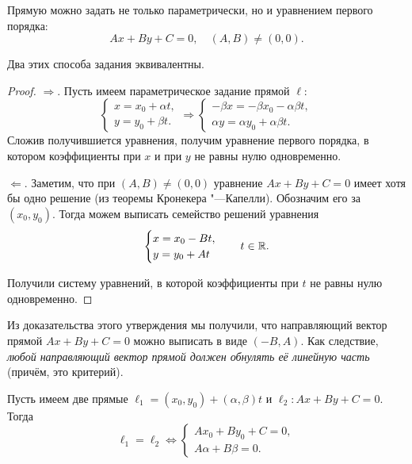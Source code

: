 Прямую можно задать не только параметрически, но и уравнением первого порядка:
$$
Ax + By + C = 0,\quad(A, B) \ne (0, 0).
$$

\begin{theorem}
    Два этих способа задания эквивалентны.
\end{theorem}

\begin{proof}
    $\Rightarrow$. Пусть имеем параметрическое задание прямой $\ell$:
    $$
    \begin{cases}
        x = x_0 + \alpha t,\\
        y = y_0 + \beta t.
    \end{cases} \Rightarrow 
    \begin{cases}
        -\beta x = -\beta x_0 -\alpha\beta t,\\
        \alpha y = \alpha y_0 + \alpha\beta t.
    \end{cases}
    $$
    Сложив получившиется уравнения, получим уравнение первого порядка, в котором коэффициенты при $x$ и при $y$ не равны нулю одновременно.

    $\Leftarrow$. Заметим, что при $(A, B) \ne (0, 0)$ уравнение $Ax + By + C = 0$ имеет хотя бы одно решение (из теоремы Кронекера "---Капелли). Обозначим его за $(x_0, y_0)$. Тогда можем выписать семейство решений уравнения
    $$
    \begin{cases}
        x = x_0 - Bt,\\
        y = y_0 + At
    \end{cases}\quad t \in \mathbb{R}.
    $$

    Получили систему уравнений, в которой коэффициенты при $t$ не равны нулю одновременно.
\end{proof}

\begin{remark}
    Из доказательства этого утверждения мы получили, что направляющий вектор прямой $Ax + By + C = 0$ можно выписать в виде $(-B, A)$. Как следствие, \textit{любой направляющий вектор прямой должен обнулять её линейную часть} (причём, это критерий).
\end{remark}

\begin{statement}
    Пусть имеем две прямые $\ell_1 = (x_0, y_0) + (\alpha, \beta)t$ и $\ell_2: Ax + By + C = 0$. Тогда
    $$
    \ell_1 = \ell_2 \Leftrightarrow
    \begin{cases}
        Ax_0 + By_0 + C = 0,\\
        A\alpha + B\beta = 0.
    \end{cases}
    $$
\end{statement}


